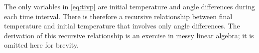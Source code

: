 \documentclass[conference]{IEEEtran}
\begin{document}
The only variables in \eqref{eq:tivp} are initial temperature and angle differences during each time interval. There is therefore a recursive relationship between final temperature and initial temperature that involves only angle differences. The derivation of this recursive relationship is an exercise in messy linear algebra; it is omitted here for brevity.
%
%
\end{document}
